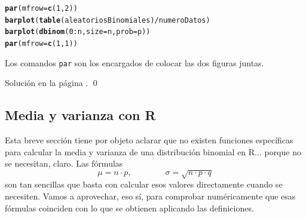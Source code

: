 \documentclass[10pt,a4paper]{article}\usepackage[]{graphicx}\usepackage[]{color}
\makeatletter
\newcommand{\hlnum}[1]{\textcolor[rgb]{0.686,0.059,0.569}{#1}}%
\newcommand{\hlopt}[1]{\textcolor[rgb]{0,0,0}{#1}}%
\newcommand{\hlstd}[1]{\textcolor[rgb]{0.345,0.345,0.345}{#1}}%
\newcommand{\hlkwc}[1]{\textcolor[rgb]{0.333,0.667,0.333}{#1}}%
\newcommand{\hlkwd}[1]{\textcolor[rgb]{0.737,0.353,0.396}{\textbf{#1}}}%
\newenvironment{kframe}{%
 \def\at@end@of@kframe{}%
 \ifinner\ifhmode%
  \def\at@end@of@kframe{\end{minipage}}%
  \begin{minipage}{\columnwidth}%
 \fi\fi%
 \def\FrameCommand##1{\hskip\@totalleftmargin \hskip-\fboxsep
 \colorbox{shadecolor}{##1}\hskip-\fboxsep
     \hskip-\linewidth \hskip-\@totalleftmargin \hskip\columnwidth}%
 \MakeFramed {\advance\hsize-\width
   \@totalleftmargin\z@ \linewidth\hsize
   \@setminipage}}%
 {\par\unskip\endMakeFramed%
 \at@end@of@kframe}
\newenvironment{knitrout}{}{} %
\makeatother
\begin{document}
\begin{ejercicio}
\begin{enumerate}
\begin{knitrout}
\begin{kframe}
\begin{alltt}
\hlkwd{par}\hlstd{(}\hlkwc{mfrow}\hlstd{=}\hlkwd{c}\hlstd{(}\hlnum{1}\hlstd{,}\hlnum{2}\hlstd{))}
\hlkwd{barplot}\hlstd{(}\hlkwd{table}\hlstd{(aleatoriosBinomiales)}\hlopt{/}\hlstd{numeroDatos)}
\hlkwd{barplot}\hlstd{(}\hlkwd{dbinom}\hlstd{(}\hlnum{0}\hlopt{:}\hlstd{n,} \hlkwc{size}\hlstd{=n,} \hlkwc{prob}\hlstd{=p))}
\hlkwd{par}\hlstd{(}\hlkwc{mfrow}\hlstd{=}\hlkwd{c}\hlstd{(}\hlnum{1}\hlstd{,}\hlnum{1}\hlstd{))}
\end{alltt}
\end{kframe}
\end{knitrout}
        Los comandos {\tt par} son los encargados de colocar las dos figuras juntas.

\end{enumerate}
Solución en la página \pageref{tut05:ejercicio06:sol}.
\qed
\end{ejercicio}

\subsection{Media y varianza con R}
\label{tut05:subsec:MediaVarianzaBinomialConR}

Esta breve sección tiene por objeto aclarar que no existen funciones específicas para calcular la media y varianza de una distribución binomial en R... porque no se necesitan, claro. Las fórmulas
\[\mu=n\cdot p, \qquad\qquad\sigma = \sqrt{n\cdot p\cdot q}\]
son tan sencillas que basta con calcular esos valores directamente cuando se necesiten. Vamos a aprovechar, eso sí, para comprobar numéricamente que esas fórmulas coinciden con lo que se obtienen aplicando las definiciones.
\end{document}

